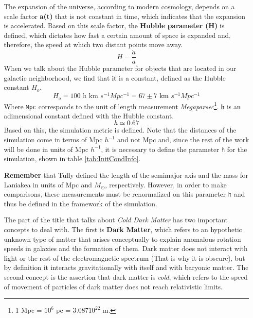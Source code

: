 \documentclass[a4paper,fleqn,usenatbib]{mnras}
\begin{document}
The expansion of the universe, according to modern cosmology, depends on a scale factor \textbf{a(t)} that is not constant in time, which indicates that the expansion is accelerated. Based on this scale factor, the \textbf{Hubble parameter (H)} is defined, which dictates how fast a certain amount of space is expanded and, therefore, the speed at which two distant points move away.
\begin{equation}
    H = \frac{\dot{a}}{a}
\end{equation}
When we talk about the Hubble parameter for objects that are located in our galactic neighborhood, we find that it is a constant, defined as the Hubble constant \textbf{$H_o$}.
\begin{equation}
    H_o = \text{100 h km }s^{-1}  Mpc^{-1} = 67 \pm 7\text{ km } s^{-1}Mpc^{-1}
\end{equation}
Where \texttt{Mpc} corresponds to the unit of length measurement \emph{Megaparsec}\footnote{1 Mpc = $10^6$ pc = 3.087$10^{22}$ m.}. \texttt{h} is an adimensional constant defined with the Hubble constant.
\begin{equation}
    h \simeq 0.67
\end{equation}
Based on this, the simulation metric is defined. Note that the distances of the simulation come in terms of Mpc  $h^{-1}$ and not Mpc and, since the rest of the work will be done in units of Mpc $h^{-1}$, it is necessary to define the parameter \texttt{h} for the simulation, shown in table \ref{tab:InitCondInfo}.

\textbf{Remember} that Tully defined the length of the semimajor axis and the mass for Laniakea in units of Mpc and $M_{\odot}$, respectively\cite{tully_laniakea_2014}. However, in order to make comparisons, these measurements must be renormalized on this parameter \texttt{h} and thus be defined in the framework of the simulation.

The part of the title that talks about \emph{Cold Dark Matter} has two important concepts to deal with. The first is \textbf{Dark Matter}, which refers to an hypothetic unknown type of matter that arises conceptually to explain anomalous rotation speeds in galaxies and the formation of them\cite{GalaxyDM}. Dark matter does not interact with light or the rest of the electromagnetic spectrum (That is why it is obscure), but by definition it interacts gravitationally with itself and with baryonic matter. The second concept is the assertion that dark matter is \emph{cold}, which refers to the speed of movement of particles of dark matter does not reach relativistic limits.
\end{document}
